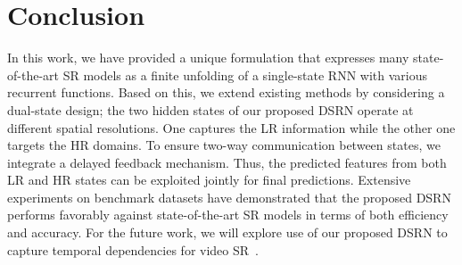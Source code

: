 \documentclass[10pt,twocolumn,letterpaper]{article}
\newcommand{\algname}{DSRN }
\begin{document}
		
	













 























































	
	
	






 
\section{Conclusion}
In this work, we have provided a unique formulation that expresses many state-of-the-art SR models as a finite unfolding of a single-state RNN with various recurrent functions.  Based on this, we extend existing methods by considering a dual-state design; the two hidden states of our proposed \algname operate at different spatial resolutions. One captures the LR information while the other one targets the HR domains.  To ensure two-way communication between states, we integrate a delayed feedback mechanism.  Thus, the predicted features from both LR and HR states can be exploited jointly for final predictions.  Extensive experiments on benchmark datasets have demonstrated that the proposed \algname performs favorably against state-of-the-art SR models in terms of both efficiency and accuracy. For the future work, we will explore use of our proposed DSRN to capture temporal dependencies for video SR~\cite{liu2017robust}. 








\end{document}
